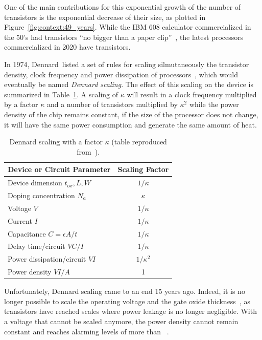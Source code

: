         One of the main contributions for this exponential growth of the number of transistors is the exponential
        decrease of their size, as plotted in Figure~\ref{fig:context:49_years}. While the IBM 608 calculator
        commercialized in the 50's had transistors ``no bigger than a paper clip''~\cite{ibm608}, the latest processors
        commercialized in 2020 have  transistors.

        In 1974, Dennard~\etal listed a set of rules for scaling silmutaneously the transistor density, clock frequency
        and power dissipation of processors~\cite{dennard}, which would eventually be named \emph{Dennard scaling}. The
        effect of this scaling on the device is summarized in Table~\ref{tab:dennard}. A scaling of \(\kappa\) will
        result in a clock frequency multiplied by a factor \(\kappa\) and a number of transistors multiplied by
        \(\kappa^2\) while the power density of the chip remains constant, \ie if the size of the processor does not
        change, it will have the same power consumption and generate the same amount of heat.

        \begin{table}[htpb]
            \centering
            \caption{Dennard scaling with a factor \(\kappa\) (table reproduced from~\cite[Table 1]{dennard}).}
            \label{tab:dennard}
            \begin{tabular}{l|c}
                Device or Circuit Parameter & Scaling Factor\\
                \hline
                Device dimension \(t_{ox}, L, W\) & \(1/\kappa\)\\
                Doping concentration \(N_a\) & \(\kappa\)\\
                Voltage \(V\) & \(1/\kappa\)\\
                Current \(I\) & \(1/\kappa\)\\
                Capacitance \(C=\epsilon A/t\) & \(1/\kappa\)\\
                Delay time/circuit \(VC/I\) & \(1/\kappa\)\\
                Power dissipation/circuit \(VI\) & \(1/\kappa^2\)\\
                Power density \(VI/A\) & 1\\
            \end{tabular}
        \end{table}

        Unfortunately, Dennard scaling came to an end 15 years ago. Indeed, it is no longer possible to scale the
        operating voltage and the gate oxide thickness~\cite{Bohr_2007}, as transistors have reached scales where power
        leakage is no longer negligible. With a voltage that cannot be scaled anymore, the power density cannot remain
        constant and reaches alarming levels of more than
        ~\cite{Hennessy_2019,Hennessy_youtube}.

